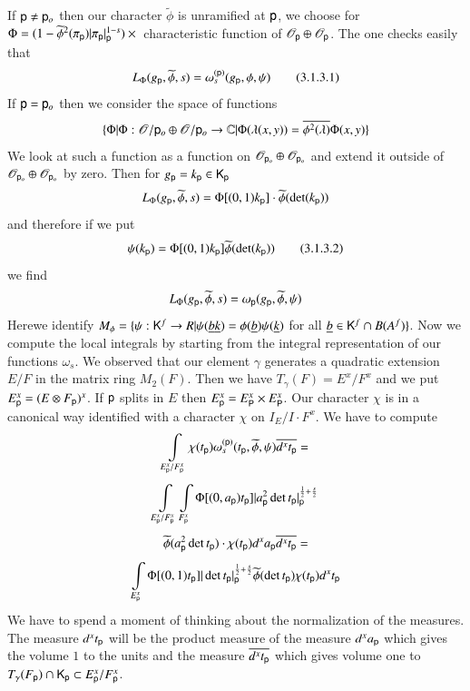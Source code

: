 If $\mathsf{p}\neq \mathsf{p}_{o}$ then our character $\widetilde{\phi}$ is unramified at $\mathsf{p}$, we choose for $\Phi=(1-\widetilde{\phi}^{2}(\pi_{\mathsf{p}})|\pi_{\mathsf{p}}|^{1-s}_{\mathsf{p}})\times{}$ characteristic function of $\mathscr{O}_{\mathsf{p}}\oplus \mathscr{O}_{\mathsf{p}}$. The one checks easily that
\begin{equation*}
L_{\Phi}(g_{\mathsf{p}},\widetilde{\phi},s)=\omega^{(\mathsf{p})}_{s}(g_{\mathsf{p}},\phi,\psi)\tag{3.1.3.1}\label{art2-eq3.1.3.1}
\end{equation*}
If $\mathsf{p}=\mathsf{p}_{o}$ then we consider the space of functions
$$
\{\Phi|\Phi:\mathscr{O}/\mathsf{p}_{o}\oplus \mathscr{O}/\mathsf{p}_{o}\to \mathbb{C}|\Phi(\lambda(x,y))=\overline{\phi^{2}(\lambda)}\Phi(x,y)\}
$$
We look at such a function as a function on $\mathscr{O}_{\mathsf{p}_{o}}\oplus \mathscr{O}_{\mathsf{p}_{o}}$ and extend it outside of $\mathscr{O}_{\mathsf{p}_{o}}\oplus \mathscr{O}_{\mathsf{p}_{o}}$ by zero. Then for $g_{\mathsf{p}}=k_{\mathsf{p}}\in \mathsf{K}_{\mathsf{p}}$
$$
L_{\Phi}(g_{\mathsf{p}},\widetilde{\phi},s)=\Phi[(0,1)k_{\mathsf{p}}]\cdot \widetilde{\phi}(\det (k_{\mathsf{p}}))
$$
and therefore if we put
\begin{equation*}
\psi(k_{\mathsf{p}})=\Phi[(0,1)k_{\mathsf{p}}]\widetilde{\phi}(\det(k_{\mathsf{p}}))\tag{3.1.3.2}\label{art2-eq3.1.3.2}
\end{equation*}
we find
$$
L_{\Phi}(g_{\mathsf{p}},\widetilde{\phi},s)=\omega_{\mathsf{p}}(g_{\mathsf{p}},\widetilde{\phi},\psi)
$$
Here\pageoriginale we identify $M_{\phi}=\{\psi:\mathsf{K}^{f}\to R|\psi(\underline{b}\underline{k})=\phi(\underline{b})\psi(\underline{k})$ for all $\underline{b}\in \mathsf{K}^{f}\cap B(A^{f})\}$. Now we compute the local integrals by starting from the integral representation of our functions $\omega_{s}$. We observed that our element $\gamma$ generates a quadratic extension $E/F$ in the matrix ring $M_{2}(F)$. Then we have $T_{\gamma}(F)=E^{x}/F^{x}$ and we put $E^{x}_{\mathsf{p}}=(E\otimes F_{\mathsf{p}})^{x}$. If $\mathsf{p}$ splits in $E$ then $E^{x}_{\mathsf{p}}=E^{x}_{\mathsf{P}}\times E^{x}_{\mathsf{P}}$. Our character $\chi$ is in a canonical way identified with a character $\chi$ on $I_{E}/I\cdot F^{x}$. We have to compute
\begin{gather*}
\int\limits_{E^{x}_{\mathsf{p}}/F^{x}_{\mathsf{p}}}\chi(t_{\mathsf{p}})\omega^{(\mathsf{p})}_{s}(t_{\mathsf{p}},\widetilde{\phi},\psi)\overline{d^{x}t_{\mathsf{p}}}=\\[4pt]
\int\limits_{E^{x}_{\mathsf{p}}/F^{x}_{\mathsf{p}}}\int\limits_{F^{x}_{\mathsf{p}}}\Phi[(0,a_{\mathsf{p}})t_{\mathsf{p}}]|a^{2}_{\mathsf{p}}\det t_{\mathsf{p}}|_{\mathsf{p}}^{\frac{1}{2}+\frac{s}{2}}\\[4pt]
\widetilde{\phi}(a^{2}_{\mathsf{p}}\det t_{\mathsf{p}})\cdot \chi(t_{\mathsf{p}})d^{x}a_{\mathsf{p}}\overline{d^{x}t_{\mathsf{p}}}=\\[4pt]
\int\limits_{E^{x}_{\mathsf{p}}}\Phi[(0,1)t_{\mathsf{p}}]|\det t_{\mathsf{p}}|_{\mathsf{p}}^{\frac{1}{2}+\frac{s}{2}}\widetilde{\phi}(\det t_{\mathsf{p}})\chi(t_{\mathsf{p}})d^{x}t_{\mathsf{p}}
\end{gather*}
We have to spend a moment of thinking about the normalization of the measures. The measure $d^{x}t_{\mathsf{p}}$ will be the product measure of the measure $d^{x}a_{\mathsf{p}}$ which gives the volume $1$ to the units and the measure $\overline{d^{x}t_{\mathsf{p}}}$ which gives volume one to $T_{\gamma}(F_{\mathsf{p}})\cap \mathsf{K}_{\mathsf{p}}\subset E^{x}_{\mathsf{p}}/F^{x}_{\mathsf{p}}$.


